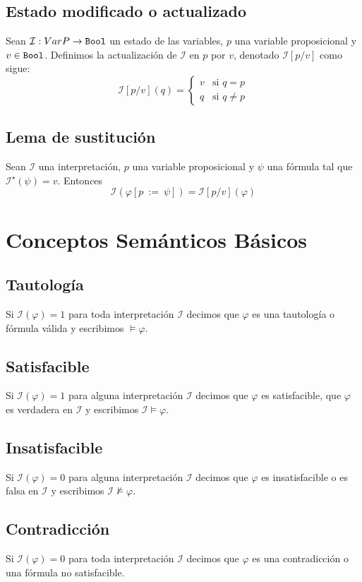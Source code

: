 \documentclass[a4paper]{article}
\begin{document}
\subsection{Estado modificado o actualizado}
\noindent
Sean $\mathcal{I}: VarP \to \text{\texttt{Bool}}$ un estado de las variables, $p$ una variable 
proposicional y $v \in \text{\texttt{Bool}}$. Definimos la actualización de $\mathcal{I}$ en $p$ por 
$v$, denotado $\mathcal{I}[p/v]$ como sigue:
\[
    \mathcal{I}\left[p / v\right]\left(q\right) =
    \begin{cases}
        v & \text{si } q = p \\
        q & \text{si } q \neq p
    \end{cases}
\]
\subsection{Lema de sustitución}
Sean $\mathcal{I}$ una interpretación, $p$ una variable 
proposicional y $\psi$ una fórmula tal que $\mathcal{I}^{\star}(\psi) = v$. Entonces
\[
    \mathcal{I}\left(\varphi\left[p \ := \ \psi\right]\right) = \mathcal{I}\left[p / v\right]\left(\varphi\right)
\]
\section{Conceptos Semánticos Básicos}
\subsection{Tautología}
Si $\mathcal{I}(\varphi)=1$ para toda interpretación $\mathcal{I}$ decimos que 
$\varphi$ es una tautología o fórmula válida y escribimos $\models\varphi$.
\subsection{Satisfacible}
Si $\mathcal{I}(\varphi)=1$ para alguna interpretación $\mathcal{I}$ decimos que 
$\varphi$ es satisfacible,  que \(\varphi\) es verdadera en \(\mathcal{I}\) y 
escribimos $ \mathcal{I} \models\varphi$.
\subsection{Insatisfacible}
Si $\mathcal{I}(\varphi)=0$ para alguna interpretación $\mathcal{I}$ decimos que 
$\varphi$ es insatisfacible o es falsa en \(\mathcal{I}\) y 
escribimos $ \mathcal{I} \nvDash\varphi$.
\subsection{Contradicción}
Si $\mathcal{I}(\varphi)=0$ para toda interpretación $\mathcal{I}$ decimos que 
$\varphi$ es una contradicción o una fórmula no satisfacible.
\end{document}
